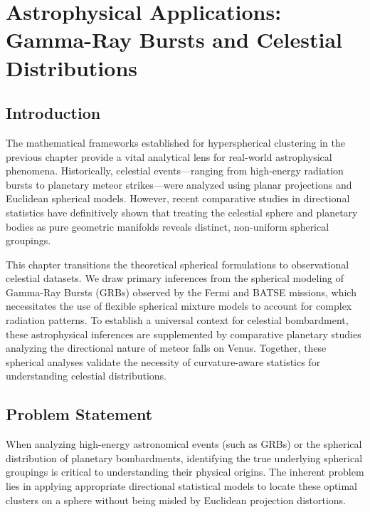 \documentclass[12pt,a4paper]{report}
\begin{document}
\clearpage
\chapter{Astrophysical Applications: Gamma-Ray Bursts and Celestial Distributions}

\section{Introduction}
The mathematical frameworks established for hyperspherical clustering in the previous chapter provide a vital analytical lens for real-world astrophysical phenomena. Historically, celestial events—ranging from high-energy radiation bursts to planetary meteor strikes—were analyzed using planar projections and Euclidean spherical models. However, recent comparative studies in directional statistics have definitively shown that treating the celestial sphere and planetary bodies as pure geometric manifolds reveals distinct, non-uniform spherical groupings.

This chapter transitions the theoretical spherical formulations to observational celestial datasets. We draw primary inferences from the spherical modeling of Gamma-Ray Bursts (GRBs) observed by the Fermi and BATSE missions, which necessitates the use of flexible spherical mixture models to account for complex radiation patterns. To establish a universal context for celestial bombardment, these astrophysical inferences are supplemented by comparative planetary studies analyzing the directional nature of meteor falls on Venus. Together, these spherical analyses validate the necessity of curvature-aware statistics for understanding celestial distributions.

\section{Problem Statement}
When analyzing high-energy astronomical events (such as GRBs) or the spherical distribution of planetary bombardments, identifying the true underlying spherical groupings is critical to understanding their physical origins. The inherent problem lies in applying appropriate directional statistical models to locate these optimal clusters on a sphere without being misled by Euclidean projection distortions. 
\end{document}
